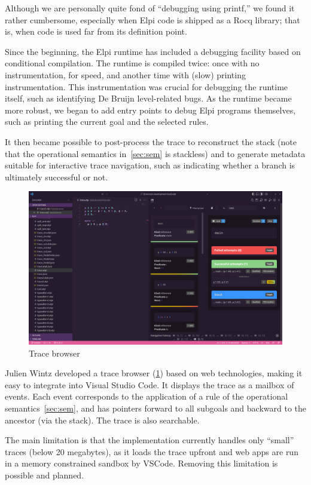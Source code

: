 \documentclass{these-ISSS}
\begin{document}
Although we are personally quite fond of ``debugging using printf,'' we found
it rather cumbersome, especially when Elpi code is shipped as a Rocq library;
that is, when code is used far from its definition point.

Since the beginning, the Elpi runtime has included a debugging facility based
on conditional compilation. The runtime is compiled twice: once with
no instrumentation, for speed, and another time with (slow) printing
instrumentation. This instrumentation was crucial for debugging the runtime
itself, such as identifying De Bruijn level-related bugs. As the runtime
became more robust, we began to add entry points to debug Elpi programs
themselves, such as printing the current goal and the selected rules.

It then became possible to post-process the trace to reconstruct the
stack (note that the operational semantics in~\cref{sec:sem} is stackless)
and to generate metadata suitable for interactive trace navigation, such as
indicating whether a branch is ultimately successful or not.

\begin{figure}
    \includegraphics[width=.9\textwidth]{elpi-tracer}
    \caption{Trace browser\label{fig:trace}}
\end{figure}

Julien Wintz developed a trace browser (\cref{fig:trace}) based on web
technologies, making it easy to integrate into Visual Studio Code. It displays
the trace as a mailbox of events. Each event corresponds to the application of
a rule of the operational semantics~\cref{sec:sem}, and has pointers forward
to all subgoals and backward to the ancestor (via the stack). The trace is
also searchable.

The main limitation is that the implementation currently handles only
``small'' traces (below 20 megabytes), as it loads the trace upfront
and web apps are run in a memory constrained sandbox by VSCode.
Removing
this limitation is possible and planned.
\end{document}
